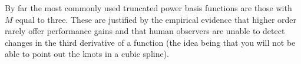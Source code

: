 \documentclass[12pt,hidelinks]{article}
\numberwithin{equation}{section}
\begin{document}
By far the most commonly used truncated power basis functions are those with
$M$ equal to three. These are justified by the empirical evidence that higher
order rarely offer performance gains and that human observers are unable
to detect changes in the third derivative of a function (the idea being
that you will not be able to point out the knots in a cubic spline).
\end{document}
